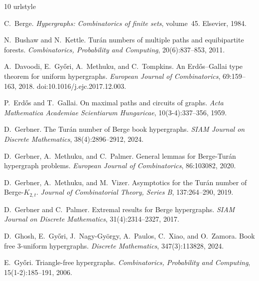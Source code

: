 \documentclass[12pt]{article}%
\begin{document}
\begin{thebibliography}{10}
\expandafter\ifx\csname urlstyle\endcsname\relax
  \providecommand{\doi}[1]{doi:\discretionary{}{}{}#1}\else
  \providecommand{\doi}{doi:\discretionary{}{}{}\begingroup
  \urlstyle{rm}\Url}\fi

C.~Berge.
\newblock \emph{Hypergraphs: Combinatorics of finite sets}, volume~45.
\newblock Elsevier, 1984.

N.~Bushaw and N.~Kettle.
\newblock Tur{\'a}n numbers of multiple paths and equibipartite forests.
\newblock \emph{Combinatorics, Probability and Computing}, 20(6):837--853,
  2011.

A.~Davoodi, E.~Győri, A.~Methuku, and C.~Tompkins.
\newblock An Erdős–Gallai type theorem for uniform hypergraphs.
\newblock \emph{European Journal of Combinatorics}, 69:159--163, 2018.
\newblock \doi{10.1016/j.ejc.2017.12.003}.

P.~Erd{\H{o}}s and T.~Gallai.
\newblock On maximal paths and circuits of graphs.
\newblock \emph{Acta Mathematica Academiae Scientiarum Hungaricae},
  10(3-4):337--356, 1959.

D.~Gerbner.
\newblock The Tur{\'a}n number of Berge book hypergraphs.
\newblock \emph{SIAM Journal on Discrete Mathematics}, 38(4):2896--2912, 2024.

D.~Gerbner, A.~Methuku, and C.~Palmer.
\newblock General lemmas for Berge-Tur{\'a}n hypergraph problems.
\newblock \emph{European Journal of Combinatorics}, 86:103082, 2020.

D.~Gerbner, A.~Methuku, and M.~Vizer.
\newblock Asymptotics for the Tur{\'a}n number of Berge-$K_{2, t}$.
\newblock \emph{Journal of Combinatorial Theory, Series B}, 137:264--290, 2019.

D.~Gerbner and C.~Palmer.
\newblock Extremal results for Berge hypergraphs.
\newblock \emph{SIAM Journal on Discrete Mathematics}, 31(4):2314--2327, 2017.

D.~Ghosh, E.~Gy{\H{o}}ri, J.~Nagy-Gy{\"o}rgy, A.~Paulos, C.~Xiao, and
  O.~Zamora.
\newblock Book free 3-uniform hypergraphs.
\newblock \emph{Discrete Mathematics}, 347(3):113828, 2024.

E.~Gy{\H{o}}ri.
\newblock Triangle-free hypergraphs.
\newblock \emph{Combinatorics, Probability and Computing}, 15(1-2):185--191,
  2006.


\end{thebibliography}
\end{document}

